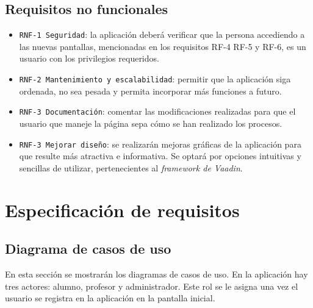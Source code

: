\subsection{Requisitos no funcionales}
\begin{itemize}
	\item \texttt{RNF-1 Seguridad}: la aplicación deberá verificar que la persona accediendo a las nuevas pantallas, mencionadas en los requisitos RF-4 RF-5 y RF-6, es un usuario con los privilegios requeridos.
	\item \texttt{RNF-2 Mantenimiento y escalabilidad}: permitir que la aplicación siga ordenada, no sea pesada y permita incorporar más funciones a futuro.
	\item \texttt{RNF-3 Documentación}: comentar las modificaciones realizadas para que el usuario que maneje la página sepa cómo se han realizado los procesos. 
	\item\texttt{RNF-3 Mejorar diseño}: se realizarán mejoras gráficas de la aplicación para que resulte más atractiva e informativa. Se optará por opciones intuitivas y sencillas de utilizar, pertenecientes al \emph{framework de Vaadin}.
\end{itemize}

\section{Especificación de requisitos}

\subsection{Diagrama de casos de uso}
En esta sección se mostrarán los diagramas de casos de uso. En la aplicación hay tres actores: alumno, profesor y administrador.
Este rol se le asigna una vez el usuario se registra en la aplicación en la pantalla inicial.


